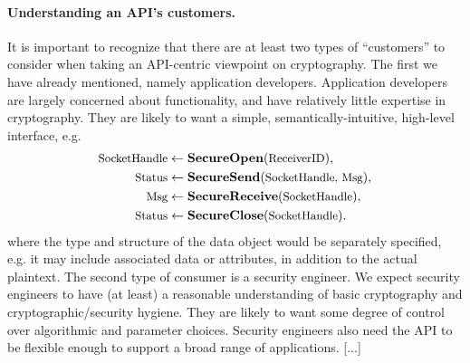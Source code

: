 \paragraph{Understanding an API's customers. }
It is important to recognize that there are at least two types of ``customers''
to consider when taking an API-centric viewpoint on cryptography. The first we
have already mentioned, namely application developers. Application developers
are largely concerned about functionality, and have relatively little expertise
in cryptography. They are likely to want a simple, semantically-intuitive,
high-level interface, e.g.
\begin{align*}
\textrm{\small SocketHandle}&\gets\textsf{\bf SecureOpen}(\textrm{\small ReceiverID}), \\
\textrm{\small Status}&\gets\textsf{\bf SecureSend}(\textrm{\small SocketHandle, Msg}),\\
\textrm{\small Msg}&\gets\textsf{\bf SecureReceive}(\textrm{\small SocketHandle}), \\
\textrm{\small Status}&\gets\textsf{\bf SecureClose}(\textrm{\small SocketHandle}).
\end{align*}
%
where the type and structure of the data object  would be
separately specified, e.g. it may include associated data or attributes, in
addition to the actual plaintext.
%
%
The second type of consumer is a security engineer. We expect security engineers
to have (at least) a reasonable understanding of basic cryptography and
cryptographic/security hygiene. They are likely to want some degree of control
over algorithmic and parameter choices.
%
%
Security engineers also need the API to be flexible enough to support a broad
range of applications. [...]
%

